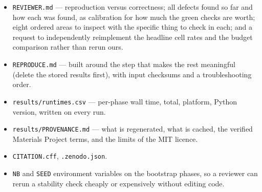 \documentclass[11pt]{article}
\begin{document}
\begin{itemize}[nosep]
\item \texttt{REVIEWER.md} --- reproduction versus correctness; all defects found so far and
      how each was found, as calibration for how much the green checks are worth; eight
      ordered areas to inspect with the specific thing to check in each; and a request to
      independently reimplement the headline cell rates and the budget comparison rather
      than rerun ours.
\item \texttt{REPRODUCE.md} --- built around the step that makes the rest meaningful
      (delete the stored results first), with input checksums and a troubleshooting order.
\item \texttt{results/runtimes.csv} --- per-phase wall time, total, platform, Python version,
      written on every run.
\item \texttt{results/PROVENANCE.md} --- what is regenerated, what is cached, the verified
      Materials Project terms, and the limits of the MIT licence.
\item \texttt{CITATION.cff}, \texttt{.zenodo.json}.
\item \texttt{NB} and \texttt{SEED} environment variables on the bootstrap phases, so a
      reviewer can rerun a stability check cheaply or expensively without editing code.
\end{itemize}
\end{document}

